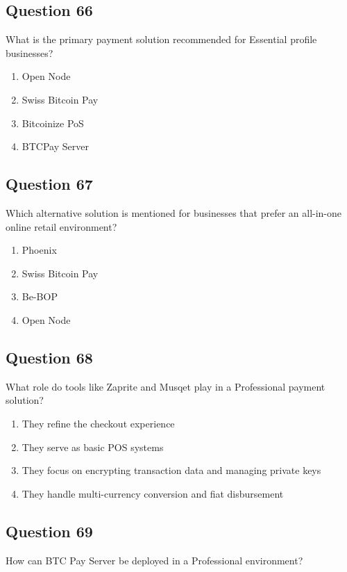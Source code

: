 \documentclass[12pt,a4paper]{article}
\begin{document}
\bigskip


\subsection*{Question 66}
What is the primary payment solution recommended for Essential profile businesses?

\begin{enumerate}[label=\Alph*., leftmargin=*]
\item Open Node
\item Swiss Bitcoin Pay
\item Bitcoinize PoS
\item BTCPay Server
\end{enumerate}

\bigskip


\subsection*{Question 67}
Which alternative solution is mentioned for businesses that prefer an all-in-one online retail environment?

\begin{enumerate}[label=\Alph*., leftmargin=*]
\item Phoenix
\item Swiss Bitcoin Pay
\item Be-BOP
\item Open Node
\end{enumerate}

\bigskip


\subsection*{Question 68}
What role do tools like Zaprite and Musqet play in a Professional payment solution?

\begin{enumerate}[label=\Alph*., leftmargin=*]
\item They refine the checkout experience
\item They serve as basic POS systems
\item They focus on encrypting transaction data and managing private keys
\item They handle multi-currency conversion and fiat disbursement
\end{enumerate}

\bigskip


\subsection*{Question 69}
How can BTC Pay Server be deployed in a Professional environment?
\end{document}
